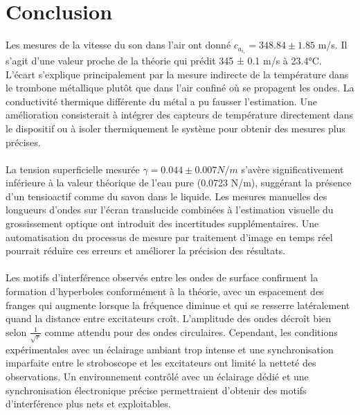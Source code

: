 \documentclass[letterpaper,12pt]{article}
\begin{document}

% 










\section{Conclusion}
Les mesures de la vitesse du son dans l'air ont donné $c_a_i_r = 348.84 \pm 1.85$ m/s. Il s'agit d'une valeur proche de la théorie qui prédit 345 ± 0.1 m/s à 23.4°C. L'écart s'explique principalement par la mesure indirecte de la température dans le trombone métallique plutôt que dans l'air confiné où se propagent les ondes. La conductivité thermique différente du métal a pu fausser l'estimation. Une amélioration consisterait à intégrer des capteurs de température directement dans le dispositif ou à isoler thermiquement le système pour obtenir des mesures plus précises.
\\\\
La tension superficielle mesurée $\gamma = 0.044 \pm 0.007 N/m$ s'avère significativement inférieure à la valeur théorique de l'eau pure (0.0723 N/m), suggérant la présence d'un tensioactif comme du savon dans le liquide. Les mesures manuelles des longueurs d'ondes sur l'écran translucide combinées à l'estimation visuelle du grossissement optique ont introduit des incertitudes supplémentaires. Une automatisation du processus de mesure par traitement d'image en temps réel pourrait réduire ces erreurs et améliorer la précision des résultats.
\\\\
Les motifs d'interférence observés entre les ondes de surface confirment la formation d'hyperboles conformément à la théorie, avec un espacement des franges qui augmente lorsque la fréquence diminue et qui se resserre latéralement quand la distance entre excitateurs croît. L'amplitude des ondes décroît bien selon $\frac{1}{\sqrt{r}}$ comme attendu pour des ondes circulaires. Cependant, les conditions expérimentales avec un éclairage ambiant trop intense et une synchronisation imparfaite entre le stroboscope et les excitateurs ont limité la netteté des observations. Un environnement contrôlé avec un éclairage dédié et une synchronisation électronique précise permettraient d'obtenir des motifs d'interférence plus nets et exploitables.
\end{document}
